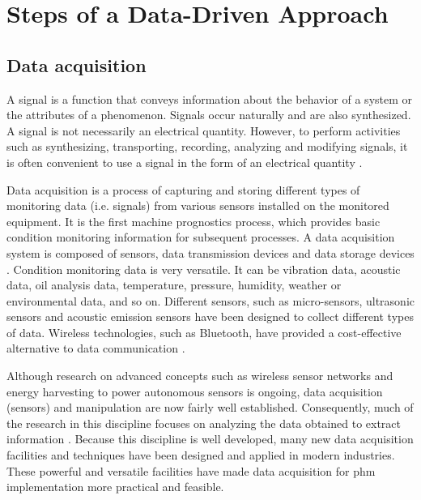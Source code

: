 \chapter{Steps of a Data-Driven Approach}

\section{Data acquisition}
\label{sec:data-acquisition}
A signal is a function that conveys information about the behavior of a system or the attributes of a phenomenon. Signals occur naturally and are also synthesized. A signal is not necessarily an electrical quantity. However, to perform activities such as synthesizing, transporting, recording, analyzing and modifying signals, it is often convenient to use a signal in the form of an electrical quantity \cite{Priemer1990}.

Data acquisition is a process of capturing and storing different types of monitoring data (i.e. signals) from various sensors installed on the monitored equipment. It is the first machine prognostics process, which provides basic condition monitoring information for subsequent processes. A data acquisition system is composed of sensors, data transmission devices and data storage devices \cite{Lei2018}. Condition monitoring data is very versatile. It can be vibration data, acoustic data, oil analysis data, temperature, pressure, humidity, weather or environmental data, and so on. Different sensors, such as micro-sensors, ultrasonic sensors and acoustic emission sensors have been designed to collect different types of data. Wireless technologies, such as Bluetooth, have provided a cost-effective alternative to data communication \cite{Jardine2006}.

Although research on advanced concepts such as wireless sensor networks and energy harvesting to power autonomous sensors is ongoing, data acquisition (sensors) and manipulation are now fairly well established. Consequently, much of the research in this discipline focuses on analyzing the data obtained to extract information \cite{Tinga2014}. Because this discipline is well developed, many new data acquisition facilities and techniques have been designed and applied in modern industries. These powerful and versatile facilities have made data acquisition for \acrshort{phm} implementation more practical and feasible\cite{Lei2016}.

